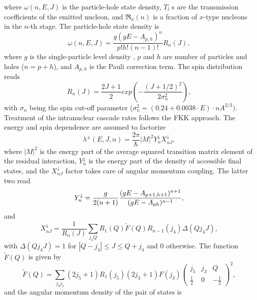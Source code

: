 \noindent where $\omega (n,E,J)$ is the particle-hole state density, $T_{l}$%
s are the transmission coefficients of the emitted nucleon, and $\Re _{x}(n)$
is a fraction of $x$-type nucleons in the $n$-th stage. The particle-hole
state density is
\begin{equation}
\omega (n,E,J)=\frac{g(gE-A_{p,h})^{n}}{p!h!(n-1)!}R_{n}(J),
\end{equation}%
\noindent where $g$ is the single-particle level density%
, $p$ and $h$ are number of particles and holes ($%
n=p+h$), and $A_{p,h}$ is the Pauli correction term. The spin distribution
reads
\begin{equation}
R_{n}(J)=%
\frac{2J+1}{2}exp\left( -\frac{(J+1/2)^{2}}{2\sigma _{n}^{2}}\right) ,
\end{equation}%
with $\sigma _{n}$ being the spin cut-off parameter ($\sigma
_{n}^{2}=(0.24+0.0038\cdot E)\cdot nA^{2/3}).$ Treatment of the intranuclear
cascade rates follows the FKK \cite{FKK} approach. The energy and spin
dependence are assumed to factorize
\begin{equation}
\lambda ^{\pm }(E,J,n)=\frac{2\pi }{\hbar }|M|^{2}Y_{n}^{\downarrow
}X_{nJ}^{\downarrow },
\end{equation}%
\noindent where $|M|^{2}$ is the energy part of the average squared
transition matrix element of the residual interaction, $Y_{n}^{\downarrow }$
is the energy part of the density of accessible final states, and the $%
X_{nJ}^{\downarrow }$ factor takes care of angular momentum coupling. The
latter two read
\begin{equation}
Y_{n}^{\downarrow }=\frac{g}{2(n+1)}\frac{(gE-A_{p+1,h+1})^{n+1}}{%
(gE-A_{ph})^{n-1}},
\end{equation}%
and
\begin{equation}
X_{nJ}^{\downarrow }=\frac{1}{R_{n}(J)}\sum_{j_{4}Q}R_{1}(Q)\widetilde{F}%
(Q)R_{n-1}(j_{4})\Delta (Qj_{4}J),
\end{equation}%
with $\Delta (Qj_{4}J)=1$ for $|Q-j_{4}|\leq J\leq Q+j_{4}$ and 0 otherwise.
The function $\widetilde{F}(Q)$ is given by
\begin{equation}
\widetilde{F}(Q)=\sum_{j_{3}j_{5}}(2j_{5}+1)R_{1}(j_{5})(2j_{3}+1)F(j_{3})%
\left(
\begin{array}{ccc}
j_{5} & j_{3} & Q \\
\frac{1}{2} & 0 & -\frac{1}{2}%
\end{array}%
\right) ^{2},
\end{equation}%
and the angular momentum density of the pair of states is
